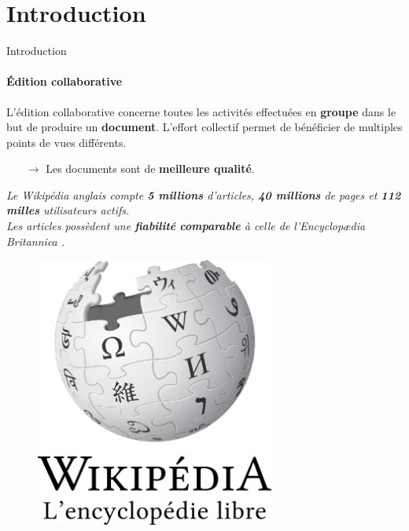 \section{Introduction}


\begin{frame}{Introduction}\framesubtitle{Édition collaborative}

  L'édition collaborative concerne toutes les activités effectuées en
  \textbf{groupe} dans le but de produire un \textbf{document}. L'effort
  collectif permet de bénéficier de multiples points de vues différents.

  \begin{itemize}
  \item[$\rightarrow$] Les documents sont de \textbf{meilleure qualité}.
  \end{itemize}
  
  \vfill

  \noindent
  \begin{minipage}{0.6\textwidth}
    \textit{Le Wikipédia anglais compte \textbf{5 millions} d'articles,
      \textbf{40 millions} de pages et \textbf{112 milles} utilisateurs
      actifs.\\Les articles possèdent une \textbf{fiabilité} \textbf{comparable}
      à celle de l'Encyclopædia Britannica \REF.}

  \end{minipage}
  \hfill
  \begin{minipage}{0.3\textwidth}
    \begin{figure}
      \begin{center}
        \includegraphics[width=0.7\textwidth]{img/wikipedia.png}
      \end{center}
    \end{figure}
  \end{minipage}
 

\end{frame}


